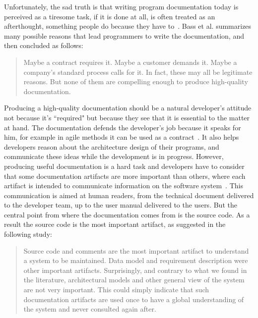 Unfortunately, the sad truth is that writing program documentation today is perceived as a tiresome task, if it is done at all, is often treated as an afterthought, something people do because they have to~\citep{sousa1998survey}. Bass et al. summarizes many possible reasons that lead programmers to write the documentation, and then concluded as follows:

\blockquote{Maybe a contract requires it. Maybe a customer demands it. Maybe a company's standard process calls for it. In fact, these may all be legitimate reasons. But none of them are compelling enough to produce high-quality documentation.~\citep[p. 327]{BassClementsKazman201210}}

Producing a high-quality documentation should be a natural developer's attitude not because it's ``required" but because they see that it is essential to the matter at hand. The documentation defends the developer's job because it speaks for him, for example in agile methods it can be used as a contract~\citep{ambler2007agile}. It also helps developers reason about the architecture design of their programs, and communicate these ideas while the development is in progress. However, producing useful documentation is a hard task and developers have to consider that some documentation artifacts are more important than others, where each artifact is intended to communicate information on the software system~\citep{forward2002relevance}. This communication is aimed at human readers, from the technical document delivered to the developer team, up to the user manual delivered to the users. But the central point from where the documentation comes from is the source code. As a result the source code is the most important artifact, as suggested in the following study:

\blockquote{Source code and comments are the most important artifact to understand a system to be maintained. Data model and requirement description were other important artifacts. Surprisingly, and contrary to what we found in the literature, architectural models and
other general view of the system are not very important. This could simply indicate that such documentation artifacts are used once to have a global understanding of the system and never consulted again after.~\citep[p. 74]{de2005study}}

